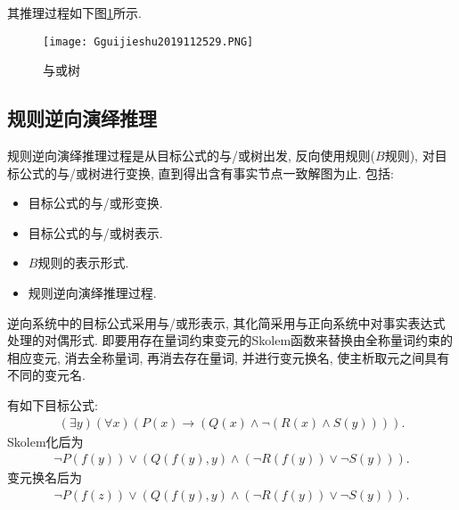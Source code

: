 其推理过程如下图\ref{AI32fig2019120129}所示.
\begin{figure}[H]
\centering
\texttt{[image: Gguijieshu2019112529.PNG]}
\caption{与或树}
\label{AI32fig2019120129}
\end{figure}
\subsection{规则逆向演绎推理}
规则逆向演绎推理过程是从目标公式的与/或树出发, 反向使用规则($B$规则), 对目标公式的与/或树进行变换, 直到得出含有事实节点一致解图为止. 包括:
\begin{itemize}
\item 目标公式的与/或形变换.
\item 目标公式的与/或树表示.
\item $B$规则的表示形式.
\item 规则逆向演绎推理过程.
\end{itemize}

逆向系统中的目标公式采用与/或形表示, 其化简采用与正向系统中对事实表达式处理的对偶形式.
即要用存在量词约束变元的Skolem函数来替换由全称量词约束的相应变元, 消去全称量词, 再消去存在量词, 并进行变元换名, 使主析取元之间具有不同的变元名.
\begin{example}
有如下目标公式:
\begin{align}
  (\exists  y) (\forall x)(P(x)\rightarrow (Q(x)\wedge \neg (R(x)\wedge S(y)))).
\end{align}
Skolem化后为
\begin{align}
  \neg P(f(y))\vee (Q(f(y), y)\wedge (\neg R(f(y))\vee \neg S(y))).
\end{align}
变元换名后为
\begin{align}
  \neg P(f(z))\vee (Q(f(y), y)\wedge (\neg R(f(y))\vee \neg S(y))).
\end{align}
\end{example}

